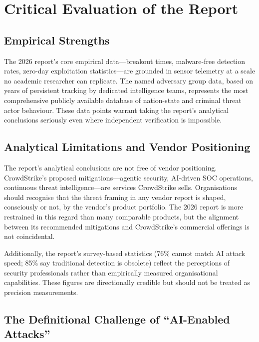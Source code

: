\documentclass[journal]{IEEEtran}
\begin{document}
\section{Critical Evaluation of the Report}

\subsection{Empirical Strengths}

The 2026 report's core empirical data---breakout times, malware-free detection rates,
zero-day exploitation statistics---are grounded in sensor telemetry at a scale no
academic researcher can replicate. The named adversary group data, based on years of
persistent tracking by dedicated intelligence teams, represents the most
comprehensive publicly available database of nation-state and criminal threat actor
behaviour. These data points warrant taking the report's analytical conclusions
seriously even where independent verification is impossible.

\subsection{Analytical Limitations and Vendor Positioning}

The report's analytical conclusions are not free of vendor positioning. CrowdStrike's
proposed mitigations---agentic security, AI-driven SOC operations, continuous threat
intelligence---are services CrowdStrike sells. Organisations should recognise that
the threat framing in any vendor report is shaped, consciously or not, by the
vendor's product portfolio. The 2026 report is more restrained in this regard than
many comparable products, but the alignment between its recommended mitigations and
CrowdStrike's commercial offerings is not coincidental.

Additionally, the report's survey-based statistics (76\% cannot match AI attack
speed; 85\% say traditional detection is obsolete) reflect the perceptions of
security professionals rather than empirically measured organisational capabilities.
These figures are directionally credible but should not be treated as precision
measurements.

\subsection{The Definitional Challenge of ``AI-Enabled Attacks''}
\end{document}
